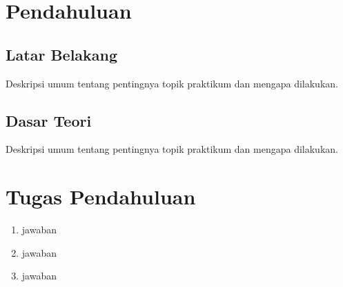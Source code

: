 \section{Pendahuluan}
\subsection{Latar Belakang}
Deskripsi umum tentang pentingnya topik praktikum dan mengapa dilakukan.
\subsection{Dasar Teori}
Deskripsi umum tentang pentingnya topik praktikum dan mengapa dilakukan.
\section{Tugas Pendahuluan}
\begin{center}
	\colorbox{cyan!30}{\parbox{0.8\linewidth}{
		\begin{enumerate}
		\item jawaban
		\item jawaban
		\item jawaban
	\end{enumerate}
	}}
\end{center}